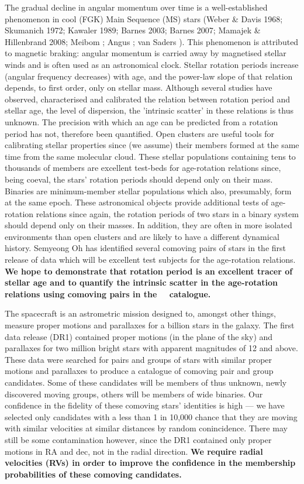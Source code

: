 \justification
The gradual decline in angular momentum over time is a well-established
phenomenon in cool (FGK) Main Sequence (MS) stars (\eg Weber \& Davis 1968;
Skumanich 1972; Kawaler 1989; Barnes 2003; Barnes 2007; Mamajek \&
Hillenbrand 2008; Meibom ; Angus ; van Saders ).
This phenomenon is attributed to magnetic braking: angular momentum is carried
away by magnetised stellar winds and is often used as an astronomical clock.
Stellar rotation periods increase (angular frequency decreases) with age, and
the power-law slope of that relation depends, to first order, only on
stellar mass.
Although several studies have observed, characterised and calibrated the
relation between rotation period and stellar age, the level of dispersion, the
'intrinsic scatter' in these relations is thus unknown.
The precision with which an age can be predicted from a rotation period has
not, therefore been quantified.
Open clusters are useful tools for calibrating stellar properties since (we
assume) their members formed at the same time from the same molecular cloud.
These stellar populations containing tens to thousands of members are
excellent test-beds for age-rotation relations since, being coeval, the stars'
rotation periods should depend only on their mass.
Binaries are minimum-member stellar populations which also, presumably, form
at the same epoch.
These astronomical objects provide additional tests of age-rotation relations
since again, the rotation periods of two stars in a binary system should
depend only on their masses.
In addition, they are often in more isolated environments than open clusters
and are likely to have a different dynamical history.
Semyeong Oh has identified several comoving pairs of stars in the first
release of \gaia data which will be excellent test subjects for the
age-rotation relations.
{\bf We hope to demonstrate that rotation period is an excellent tracer of
stellar age and to quantify the intrinsic scatter in the age-rotation
relations using comoving pairs in the \Gaia\ \TGAS\ catalogue.}

The \gaia spacecraft is an astrometric mission designed to, amongst other
things, measure proper motions and parallaxes for a billion stars in the
galaxy.
The first data release (DR1) contained proper motions (in the plane of the
sky) and parallaxes for two million bright stars with apparent magnitudes of
12 and above.
These data were searched for pairs and groups of stars with similar proper
motions and parallaxes to produce a catalogue of comoving pair and group
candidates.
Some of these candidates will be members of thus unknown, newly discovered
moving groups, others will be members of wide binaries.
Our confidence in the fidelity of these comoving stars' identities is
high --- we have selected only candidates with a less than 1 in 10,000 chance
that they are moving with similar velocities at similar distances by random
conincidence.
There may still be some contamination however, since the \gaia DR1 contained
only proper motions in RA and dec, not in the radial direction.
{\bf We require radial velocities (RVs) in order to improve the confidence in
the membership probabilities of these comoving candidates.}

